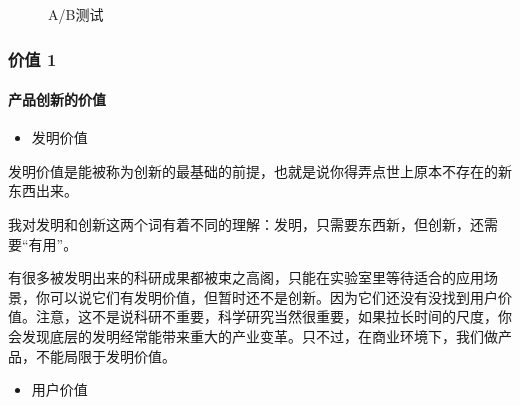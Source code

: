 \documentclass[letterpaper,11pt,english]{sphinxmanual}
\begin{document}
\begin{figure}[H]
\centering
\capstart

\noindent{}
\caption{A/B测试\sphinxfootnotemark[281]}\label{\detokenize{chapter_project/separate_need:id2}}\end{figure}
%
\begin{footnotetext}[281]\sphinxAtStartFootnote
{}
%
\end{footnotetext}\ignorespaces 
{}%
\begin{footnote}[282]\sphinxAtStartFootnote
{}
%
\end{footnote}


\subsubsection{价值 1\sphinxfootnotemark[283]}
\label{\detokenize{chapter_project/valuable:id1}}\label{\detokenize{chapter_project/valuable::doc}}%
\begin{footnotetext}[283]\sphinxAtStartFootnote
{}
%
\end{footnotetext}\ignorespaces 

\paragraph{产品创新的价值}
\label{\detokenize{chapter_project/valuable:id2}}\begin{itemize}
\item {} 
发明价值

\end{itemize}

发明价值是能被称为创新的最基础的前提，也就是说你得弄点世上原本不存在的新东西出来。

我对发明和创新这两个词有着不同的理解：发明，只需要东西新，但创新，还需要“有用”。

有很多被发明出来的科研成果都被束之高阁，只能在实验室里等待适合的应用场景，你可以说它们有发明价值，但暂时还不是创新。因为它们还没有没找到用户价值。注意，这不是说科研不重要，科学研究当然很重要，如果拉长时间的尺度，你会发现底层的发明经常能带来重大的产业变革。只不过，在商业环境下，我们做产品，不能局限于发明价值。
\begin{itemize}
\item {} 
用户价值

\end{itemize}
\end{document}
